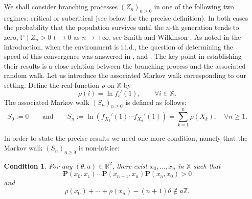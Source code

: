 \documentclass[12pt]{amsart}
\newtheorem{condition}{Condition}
\theoremstyle{definition}
\numberwithin{equation}{section}
\def\bb#1{\mathbb{#1}}
\def\bf#1{\mathbf{#1}}
\def\geq{\geqslant}
\begin{document}
We shall consider branching processes $\left( Z_n \right)_{n\geq 0}$  in one of the following  two regimes:
critical or subcritical (see below for the precise definition). 
In both cases the probability that the population survives until the $n$-th generation tends to zero,  
$\bb P \left( Z_n > 0 \right) \to 0$ as $n \to +\infty$, 
see Smith and Wilkinson \cite{smith_branching_1970}. As noted in the introduction, when the environment is i.i.d., the question of determining the speed of this convergence was answered in \cite{geiger_survival_2001}, \cite{guivarch_proprietes_2001} and \cite{geiger_limit_2003}. The key point in establishing their results is a close relation between the branching process and the associated random walk.
Let us introduce the associated Markov walk corresponding to our setting. 
Define the real function $\rho$ on $\bb X$ by
\begin{equation}
	\label{pipeau}
	\rho(i) = \ln  f_i'(1) , \qquad  \forall i \in \bb X. 
\end{equation}
The associated Markov walk  $\left( S_n \right)_{n\geq 0}$ is defined as follows:
\begin{equation}
\label{petale}
S_0 := 0 \qquad \text{and} \qquad 
S_n :=  \ln \left( f_{X_1}'(1) \cdots f_{X_n}'(1) \right)
= \sum_{k=1}^n \rho\left( X_k \right),
 \quad \forall n \geq 1.
\end{equation}

In order to state the precise results we need one more condition, namely that
the Markov walk $(S_n)_{n\geq 0}$ is non-lattice:

\begin{condition}
\label{cathedrale}
For any $(\theta,a) \in \bb R^2$, there exist $x_0, \dots, x_n$ in $\bb X$ such that
\[
\bf P(x_0,x_1) \cdots \bf P(x_{n-1},x_n) \bf P(x_n,x_0) > 0
\]
and
\[
\rho(x_0) + \cdots + \rho(x_n) - (n+1)\theta \notin a\bb Z.
\]
\end{condition}
\end{document}
